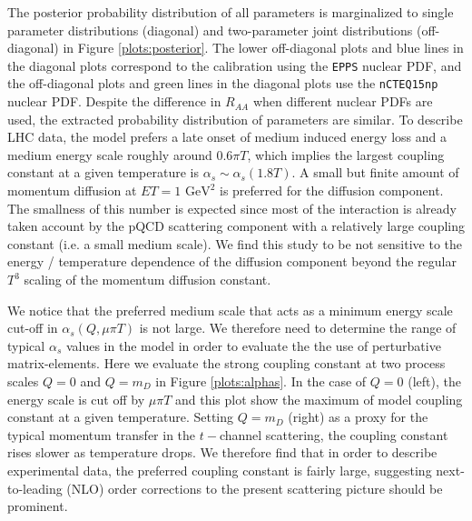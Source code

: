 \documentclass[aps, prc, reprint, amsmath, groupedaddress, nofootinbib]{revtex4-1}
\begin{document}
The posterior probability distribution of all parameters is marginalized to single parameter distributions (diagonal) and two-parameter joint distributions (off-diagonal) in Figure \ref{plots:posterior}.
The lower off-diagonal plots and blue lines in the diagonal plots correspond to the calibration using the {\tt EPPS} nuclear PDF, and the off-diagonal plots and green lines in the diagonal plots use the {\tt nCTEQ15np} nuclear PDF.
Despite the difference in $R_{AA}$ when different nuclear PDFs are used, the extracted probability distribution of parameters are similar.
To describe LHC data, the model prefers a late onset of medium induced energy loss and a medium energy scale roughly around $0.6\pi T$, which implies the largest coupling constant at a given temperature is $\alpha_s \sim \alpha_s(1.8T)$.
A small but finite amount of momentum diffusion at $ET=1\textrm{ GeV}^2$ is preferred for the diffusion component.
The smallness of this number is expected since most of the interaction is already taken account by the pQCD scattering component with a relatively large coupling constant (i.e. a small medium scale).
We find this study to be not sensitive to the energy / temperature dependence of the diffusion component beyond the regular $T^3$ scaling of the momentum diffusion constant.   

We notice that the preferred medium scale that acts as a minimum energy scale cut-off in $\alpha_s(Q, \mu\pi T)$ is not  large.
We therefore need to determine the range of typical $\alpha_s$ values in the model in order to evaluate the the use of perturbative matrix-elements.
Here we evaluate the strong coupling constant at two process scales $Q=0$ and $Q=m_D$ in Figure \ref{plots:alphas}.
In the case of $Q=0$ (left), the energy scale is cut off by $\mu\pi T$ and this plot show the maximum of model coupling constant at a given temperature.
Setting $Q=m_D$ (right) as a proxy for the typical momentum transfer in the $t-$channel scattering, the coupling constant rises slower as temperature drops.
We therefore find that in order to describe experimental data, the preferred coupling constant is fairly large, suggesting next-to-leading (NLO) order corrections to the present scattering picture should be prominent. 
\end{document}
